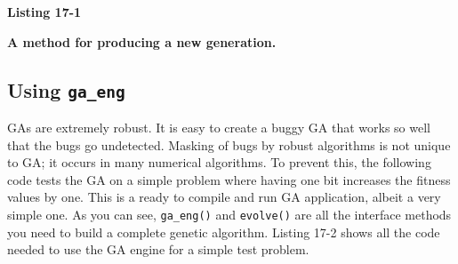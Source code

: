 \bigskip

{\sffamily\bfseries Listing 17-1}

{\sffamily\bfseries A method for producing a new generation.}


\subsection*{Using \texttt{ga\_eng}}

GAs are extremely robust. It is easy to create a buggy GA that
works so well that the bugs go undetected. Masking of
bugs by robust algorithms is not unique to GA; it occurs in many
numerical algorithms. To prevent this, the following code tests
the GA on a simple problem where having one bit increases the fitness
values by one. This is a ready to compile and run GA application,
albeit a very simple one. As you can see, \texttt{ga\_eng()} and
\texttt{evolve()} are all the interface methods you need to build a
complete genetic algorithm. Listing 17-2 shows all the code needed
to use the GA engine for a simple test problem.

\bigskip

